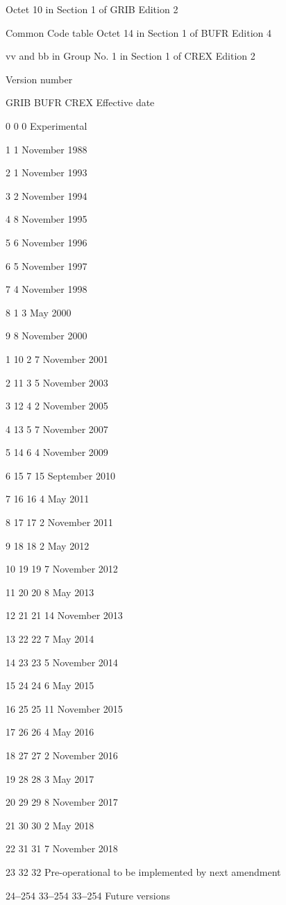 Octet 10 in Section 1 of GRIB Edition 2

Common Code table Octet 14 in Section 1 of BUFR Edition 4

vv and bb in Group No. 1 in Section 1 of CREX Edition 2

Version number

GRIB BUFR CREX Effective date

0 0 0 Experimental

1 1 November 1988

2 1 November 1993

3 2 November 1994

4 8 November 1995

5 6 November 1996

6 5 November 1997

7 4 November 1998

8 1 3 May 2000

9 8 November 2000

1 10 2 7 November 2001

2 11 3 5 November 2003

3 12 4 2 November 2005

4 13 5 7 November 2007

5 14 6 4 November 2009

6 15 7 15 September 2010

7 16 16 4 May 2011

8 17 17 2 November 2011

9 18 18 2 May 2012

10 19 19 7 November 2012

11 20 20 8 May 2013

12 21 21 14 November 2013

13 22 22 7 May 2014

14 23 23 5 November 2014

15 24 24 6 May 2015

16 25 25 11 November 2015

17 26 26 4 May 2016

18 27 27 2 November 2016

19 28 28 3 May 2017

20 29 29 8 November 2017

21 30 30 2 May 2018

22 31 31 7 November 2018

23 32 32 Pre-operational to be implemented by next amendment

24\textbf{--}254 33\textbf{--}254 33\textbf{--}254 Future versions

